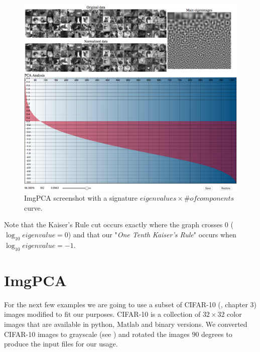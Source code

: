 \documentclass{article} %
\begin{document}

\begin{figure}[h]
\begin{center}
\includegraphics[width=\textwidth]{imgPca.png}
\end{center}
\caption{ImgPCA screenshot with a signature $eigenvalues \times \#of components$ curve.}
\end{figure}
Note that the Kaiser's Rule cut occurs exactly where the graph crosses $0$ ($\log_{10} eigenvalue = 0$) and that our "\emph{One Tenth Kaiser's Rule}" occurs when $\log_{10} eigenvalue = -1$.
\section{ImgPCA}

For the next few examples we are going to use a subset of CIFAR-10 (\citet{krizhevsky2009learning}, chapter 3) images modified to fit our purposes. CIFAR-10 is a collection of $32\times 32$ color images that are available in python, Matlab and binary versions. We converted CIFAR-10 images to grayscale (see ) and rotated the images $90$ degrees to produce the input files for our usage.\par
\end{document}
